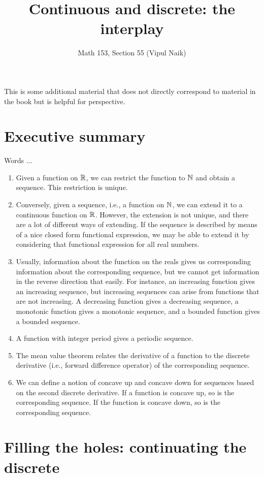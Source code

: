\documentclass[10pt]{amsart}
\title{Continuous and discrete: the interplay}
\author{Math 153, Section 55 (Vipul Naik)}
\begin{document}
\maketitle

This is some additional material that does not directly correspond to
material in the book but is helpful for perspective.

\section*{Executive summary}

Words ...

\begin{enumerate}
\item Given a function on $\mathbb{R}$, we can restrict the function to $\mathbb{N}$
  and obtain a sequence. This restriction is unique.
\item Conversely, given a sequence, i.e., a function on $\mathbb{N}$, we can
  extend it to a continuous function on $\mathbb{R}$. However, the extension
  is not unique, and there are a lot of different ways of
  extending. If the sequence is described by means of a nice closed
  form functional expression, we may be able to extend it by
  considering that functional expression for all real numbers.
\item Usually, information about the function on the reals gives us
  corresponding information about the corresponding sequence, but we
  cannot get information in the reverse direction that easily. For
  instance, an increasing function gives an increasing sequence, but
  increasing sequences can arise from functions that are not
  increasing. A decreasing function gives a decreasing sequence, a
  monotonic function gives a monotonic sequence, and a bounded
  function gives a bounded sequence.
\item A function with integer period gives a periodic sequence.
\item The mean value theorem relates the derivative of a function to
  the discrete derivative (i.e., forward difference operator) of the
  corresponding sequence.
\item We can define a notion of concave up and concave down for
  sequences based on the second discrete derivative. If a function is
  concave up, so is the corresponding sequence. If the function is
  concave down, so is the corresponding sequence.
\end{enumerate}

\section{Filling the holes: continuating the discrete}
\end{document}
